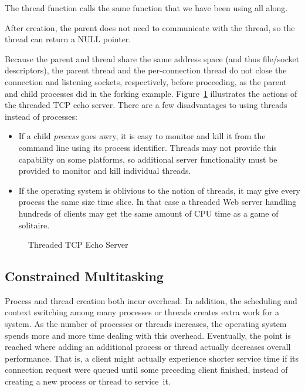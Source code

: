 \begin{topcode}
\begin{bottomcode}

The thread function calls the same 
function that we have been using all along.


After creation, the parent does not need to communicate with the
thread, so the thread can return a NULL pointer.

\end{bottomcode}

\end{topcode}

Because the parent and thread share the same address
space (and thus file/socket descriptors),
the parent thread and the per-connection thread do not close the
connection and listening sockets,  respectively,
before proceeding, as the parent and child processes did in the forking
example.  Figure~\ref{fig:TCPechoserver-thread} illustrates the
actions of the threaded TCP echo server.  There are a few
disadvantages to using threads instead of processes:

\begin{itemize}
\item If a child \emph{process\/} goes awry, it is easy to
monitor and kill it from the command line using
its process identifier.  Threads
may not provide this capability on some platforms, so additional server
functionality must be provided to monitor and kill individual threads.
\item If the operating system is oblivious to the notion of threads,
it may give every process the same size time slice.
In that case a threaded Web server handling hundreds of clients may get the
same amount of CPU time as a game of solitaire.
\end{itemize}

\begin{figure}[htbp]
\caption{\label{fig:TCPechoserver-thread}Threaded TCP Echo Server}
\end{figure}

\subsection{Constrained Multitasking}

\noindent Process and thread creation both incur overhead.  In addition, the
scheduling and context switching among many processes or threads
creates extra work for a system.
As the number of processes or threads increases,
the operating system spends more and more time dealing with
this overhead.  Eventually, the point is reached where adding an additional
process or thread actually decreases overall performance.  That is,
a client might actually experience shorter
service time if its connection request were queued until some preceding
client finished, instead of creating a new process or thread to service~it.

